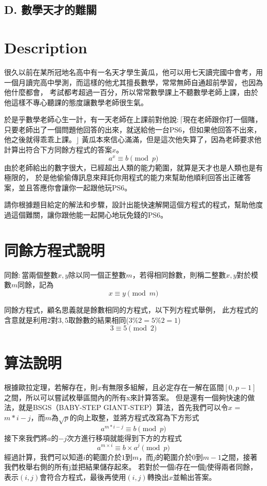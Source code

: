 \documentclass[11pt,a4paper]{article}
\begin{document}
\begin{center}
\section*{D. 數學天才的難關}
\end{center}

\section*{Description}

很久以前在某所冠地名高中有一名天才學生黃瓜，他可以用七天讀完國中會考，用一個月讀完高中學測，而這樣的他尤其擅長數學，常常無師自通超前學習，也因為他什麼都會，
考試都考超過一百分，所以常常數學課上不聽數學老師上課，由於他這樣不專心聽課的態度讓數學老師很生氣。 

於是乎數學老師心生一計，有一天老師在上課前對他說$ : \lceil $現在老師跟你打一個賭，只要老師出了一個問題他回答的出來，就送給他一台PS6，但如果他回答不出來，他之後就得乖乖上課。$ \rfloor $ 黃瓜本來信心滿滿，但是這次他失算了，因為老師要求他計算出符合下方同餘方程式的答案$x$。
$$
	a^x \equiv b \pmod{p}
$$	
由於老師給出的數字很大，已經超出人類的能力範圍，就算是天才也是人類也是有極限的，
於是他偷偷傳訊息來拜託你用程式的能力來幫助他順利回答出正確答案，並且答應你會讓你一起跟他玩PS6。

請你根據題目給定的解法和步驟，設計出能快速解開這個方程式的程式，幫助他度過這個難關，讓你跟他能一起開心地玩免錢的PS6。

\section*{同餘方程式說明}

同餘$:$當兩個整數$x, y$除以同一個正整數$m$，若得相同餘數，則稱二整數$x, y$對於模數$m$同餘，記為
$$
	x \equiv y \pmod m
$$

同餘方程式，顧名思義就是餘數相同的方程式，以下列方程式舉例，
此方程式的含意就是利用$2$對$3, 5$取餘數的結果相同($3\%2 = 5 \% 2 = 1$)\\
$$
	  3 \equiv 5 \pmod{2}
$$

\newpage

\section*{算法說明}
根據歐拉定理，若解存在，則$x$有無限多組解，且必定存在一解在區間$[0, p-1]$之間，所以可以嘗試枚舉區間內的所有x來計算答案。
但是還有一個夠快速的做法，就是BSGS（BABY-STEP GIANT-STEP）算法，首先我們可以令$x$ = $m*i-j$，而$m$為$\sqrt{p}$的向上取整，並將方程式改寫為下方形式  
$$
	a^{m * i - j} \equiv b \pmod{p}
$$
接下來我們將$a$的$-j$次方進行移項就能得到下方的方程式 
$$
	a^{m \times i} \equiv b \times a^{j} \pmod{p}
$$	
經過計算，我們可以知道$i$的範圍介於$1$到$m$，而$j$的範圍介於$0$到$m-1$之間，接著我們枚舉右側的所有j並把結果儲存起來。
若對於一個i存在一個j使得兩者同餘，表示$(i, j)$會符合方程式，最後再使用$(i, j)$轉換出$x$並輸出答案。
\end{document}
